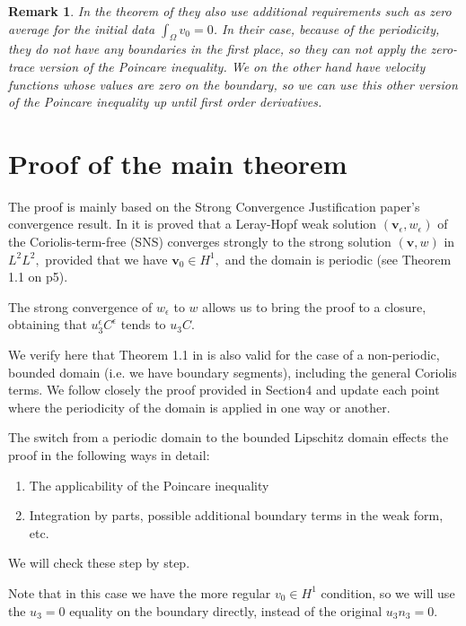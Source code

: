 \documentclass[11pt]{article}
\newtheorem{remark}{Remark}
\begin{document}
\begin{remark}
In the theorem of \cite{li2019primitive} they also use additional requirements such as zero average for the initial data $\int_\Omega v_0 = 0$. In their case, because of the periodicity, they do not have any boundaries in the first place, so they can not apply the zero-trace version of the Poincare inequality. We on the other hand have velocity functions whose values are zero on the boundary, so we can use this other version of the Poincare inequality up until first order derivatives.
\end{remark}
  
\section{Proof of the main theorem} \label{proof}

The proof is mainly based on the Strong Convergence Justification paper's convergence result. In \cite{li2019primitive} it is proved that a Leray-Hopf weak solution $(\mathbf{v}_\epsilon, w_\epsilon)$ of the Coriolis-term-free (SNS) converges strongly to the strong solution $(\mathbf{v}, w)$ in $L^2 L^2,$ provided that we have $\mathbf{v}_0 \in H^1,$ and the domain is periodic (see Theorem 1.1 on p5).

The strong convergence of $w_\epsilon$ to $w$ allows us to bring the proof to a closure, obtaining that $u_3^\epsilon C^\epsilon$ tends to $u_3 C.$

We verify here that Theorem 1.1 in \cite{li2019primitive} is also valid for the case of a non-periodic, bounded domain (i.e. we have boundary segments), including the general Coriolis terms. We follow closely the proof provided in Section4 and update each point where the periodicity of the domain is applied in one way or another.

The switch from a periodic domain to the bounded Lipschitz domain effects the proof in the following ways in detail:

\begin{enumerate}[label=\roman*)]
  \item The applicability of the Poincare inequality
  \item Integration by parts, possible additional boundary terms in the weak form, etc.
\end{enumerate}

We will check these step by step.

Note that in this case we have the more regular $v_0 \in H^1$ condition, so we will use the $u_3 = 0$ equality on the boundary directly, instead of the original $u_3 n_3 = 0.$
\end{document}

